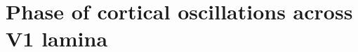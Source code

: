 \chapter{Phase of cortical oscillations across V1 lamina}
\label{ch:plam}

\graphicspath{{Chapters/laminar-phase/figs/}}


